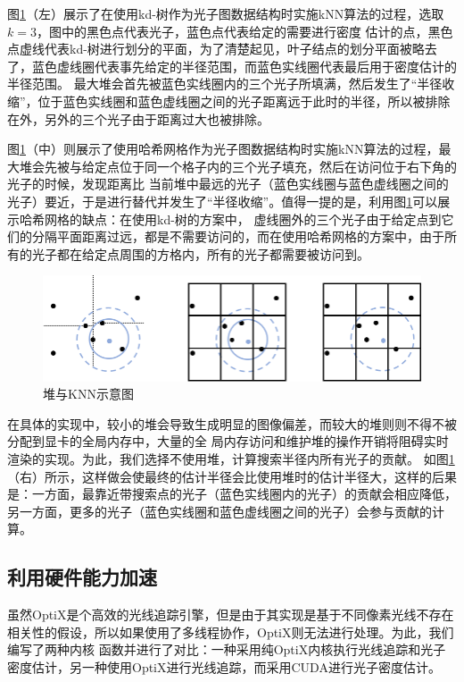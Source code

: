\documentclass[UTF8]{ctexart}
\begin{document}
        图\ref{fig:6}（左）展示了在使用kd-树作为光子图数据结构时实施kNN算法的过程，选取$k=3$，图中的黑色点代表光子，蓝色点代表给定的需要进行密度
        估计的点，黑色点虚线代表kd-树进行划分的平面，为了清楚起见，叶子结点的划分平面被略去了，蓝色虚线圈代表事先给定的半径范围，而蓝色实线圈代表最后用于密度估计的半径范围。
        最大堆会首先被蓝色实线圈内的三个光子所填满，然后发生了“半径收缩”，位于蓝色实线圈和蓝色虚线圈之间的光子距离远于此时的半径，所以被排除在外，另外的三个光子由于距离过大也被排除。

        图\ref{fig:6}（中）则展示了使用哈希网格作为光子图数据结构时实施kNN算法的过程，最大堆会先被与给定点位于同一个格子内的三个光子填充，然后在访问位于右下角的光子的时候，发现距离比
        当前堆中最远的光子（蓝色实线圈与蓝色虚线圈之间的光子）要近，于是进行替代并发生了“半径收缩”。值得一提的是，利用图\ref{fig:6}可以展示哈希网格的缺点：在使用kd-树的方案中，
        虚线圈外的三个光子由于给定点到它们的分隔平面距离过远，都是不需要访问的，而在使用哈希网格的方案中，由于所有的光子都在给定点周围的方格内，所有的光子都需要被访问到。

        \begin{figure}[htbp]
        \centering
        \includegraphics[scale=0.8]{pic/KNN.png}
        \caption{堆与KNN示意图}
        \label{fig:6}
        \end{figure}

        在具体的实现中，较小的堆会导致生成明显的图像偏差，而较大的堆则则不得不被分配到显卡的全局内存中，大量的全
        局内存访问和维护堆的操作开销将阻碍实时渲染的实现。为此，我们选择不使用堆，计算搜索半径内所有光子的贡献。
        如图\ref{fig:6}（右）所示，这样做会使最终的估计半径会比使用堆时的估计半径大，这样的后果是：一方面，最靠近带搜索点的光子（蓝色实线圈内的光子）的贡献会相应降低，
        另一方面，更多的光子（蓝色实线圈和蓝色虚线圈之间的光子）会参与贡献的计算。

    \subsection{利用硬件能力加速}
        虽然OptiX是个高效的光线追踪引擎，但是由于其实现是基于不同像素光线不存在相关性的假设，所以如果使用了多线程协作，OptiX则无法进行处理。为此，我们编写了两种内核
        函数并进行了对比：一种采用纯OptiX内核执行光线追踪和光子密度估计，另一种使用OptiX进行光线追踪，而采用CUDA进行光子密度估计。
        
\end{document}
